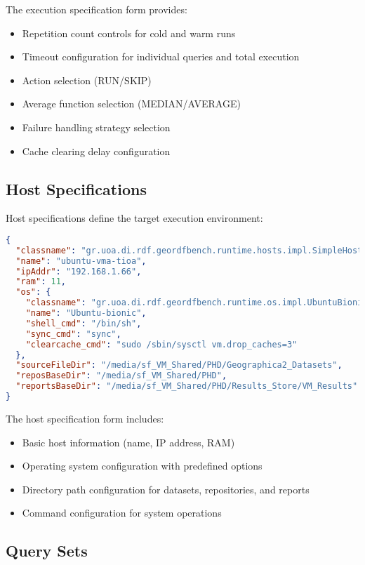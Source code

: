 \documentclass[11pt,a4paper]{article}
\begin{document}
The execution specification form provides:
\begin{itemize}
    \item Repetition count controls for cold and warm runs
    \item Timeout configuration for individual queries and total execution
    \item Action selection (RUN/SKIP)
    \item Average function selection (MEDIAN/AVERAGE)
    \item Failure handling strategy selection
    \item Cache clearing delay configuration
\end{itemize}

\subsection{Host Specifications}

Host specifications define the target execution environment:

\begin{lstlisting}[language=JSON, caption=Host Specification Example]
{
  "classname": "gr.uoa.di.rdf.geordfbench.runtime.hosts.impl.SimpleHost",
  "name": "ubuntu-vma-tioa",
  "ipAddr": "192.168.1.66",
  "ram": 11,
  "os": {
    "classname": "gr.uoa.di.rdf.geordfbench.runtime.os.impl.UbuntuBionicOS",
    "name": "Ubuntu-bionic",
    "shell_cmd": "/bin/sh",
    "sync_cmd": "sync",
    "clearcache_cmd": "sudo /sbin/sysctl vm.drop_caches=3"
  },
  "sourceFileDir": "/media/sf_VM_Shared/PHD/Geographica2_Datasets",
  "reposBaseDir": "/media/sf_VM_Shared/PHD",
  "reportsBaseDir": "/media/sf_VM_Shared/PHD/Results_Store/VM_Results"
}
\end{lstlisting}

The host specification form includes:
\begin{itemize}
    \item Basic host information (name, IP address, RAM)
    \item Operating system configuration with predefined options
    \item Directory path configuration for datasets, repositories, and reports
    \item Command configuration for system operations
\end{itemize}

\subsection{Query Sets}
\end{document}
